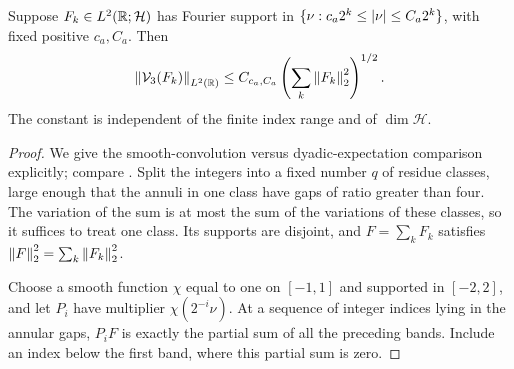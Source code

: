 \begin{lemma}\label{conc:annular-variation}
Suppose $F_k\in L^2(\mathbb R;\mathcal H)$ has Fourier support in
$\{\nu:c_a2^k\leq\left|\nu\right|\leq C_a2^k\}$, with fixed positive
$c_a,C_a$.  Then
\begin{equation}\label{conc:annular-var-bound}
 \left\|\mathcal V_3(F_k)\right\|_{L^2(\mathbb R)}
 \leq C_{c_a,C_a}
       \left(\sum_k\left\|F_k\right\|_2^2\right)^{1/2}.
\end{equation}
The constant is independent of the finite index range and of
$\dim\mathcal H$.
\end{lemma}

\begin{proof}
We give the smooth-convolution versus dyadic-expectation comparison
explicitly; compare \cite[Lemma~3.2 and Section~4]{JSW2008}.
Split the integers into a fixed number $q$ of residue classes, large
enough that the annuli in one class have gaps of ratio greater than
four.  The variation of the sum is at most the sum of the variations
of these classes, so it suffices to treat one class.  Its supports are
disjoint, and $F=\sum_kF_k$ satisfies
$\left\|F\right\|_2^2=\sum_k\left\|F_k\right\|_2^2$.

Choose a smooth function $\chi$ equal to one on $[-1,1]$ and supported
in $[-2,2]$, and let $P_i$ have multiplier $\chi(2^{-i}\nu)$.
At a sequence of integer indices lying in the annular gaps, $P_iF$
is exactly the partial sum of all the preceding bands.  Include an
index below the first band, where this partial sum is zero.


\end{proof}
